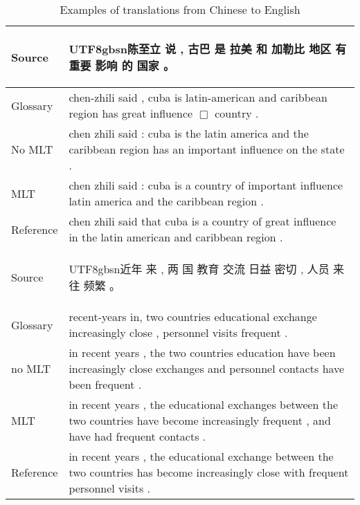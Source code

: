 \documentclass[a4paper]{article}
\newcommand{\cntext}[1]{\begin{CJK}{UTF8}{gbsn}#1\end{CJK}}
\begin{document}

\begin{table*}
\centering
\begin{tabular}{|l|m{}|} \hline
Source & \cntext{陈至立 说 , 古巴 是 拉美 和 加勒比 地区 有 重要 影响 的 国家 。}
\\ \hline
Glossary & chen-zhili said , cuba is latin-american and caribbean region has great influence $\Box$ country .
\\ \hline
No MLT & chen zhili said : cuba is the latin america and the caribbean region has an important influence on the state .
\\ \hline
MLT & chen zhili said : cuba is a country of important influence latin america and the caribbean region .
\\ \hline
Reference & chen zhili said that cuba is a country of great influence in the latin american and caribbean region .
\\ \hline \hline

Source & \cntext{近年 来 , 两 国 教育 交流 日益 密切 , 人员 来往 频繁 。}
\\ \hline
Glossary & recent-years in, two countries educational exchange increasingly close , personnel visits frequent .
\\ \hline
no MLT & in recent years , the two countries education have been increasingly close exchanges and personnel contacts have been frequent .
\\ \hline
MLT & in recent years , the educational exchanges between the two countries have become increasingly frequent , and have had frequent contacts .
\\ \hline
Reference & in recent years , the educational exchange between the two countries has become increasingly close with frequent personnel visits .
\\ \hline
\end{tabular}
\caption{Examples of translations from Chinese to English}
\label{t1}
\end{table*}
\end{document}

